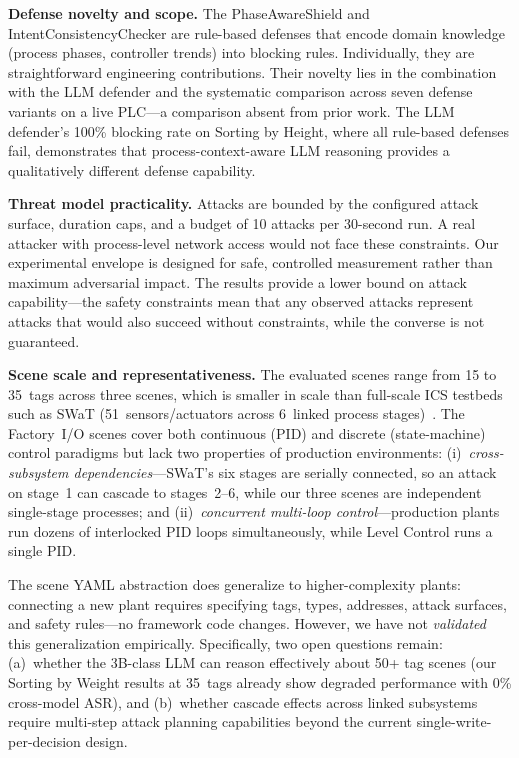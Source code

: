 \textbf{Defense novelty and scope.} The PhaseAwareShield and IntentConsistencyChecker are rule-based defenses that encode domain knowledge (process phases, controller trends) into blocking rules. Individually, they are straightforward engineering contributions. Their novelty lies in the combination with the LLM defender and the systematic comparison across seven defense variants on a live PLC---a comparison absent from prior work. The LLM defender's 100\% blocking rate on Sorting by Height, where all rule-based defenses fail, demonstrates that process-context-aware LLM reasoning provides a qualitatively different defense capability.

\textbf{Threat model practicality.} Attacks are bounded by the configured attack surface, duration caps, and a budget of 10 attacks per 30-second run. A real attacker with process-level network access would not face these constraints. Our experimental envelope is designed for safe, controlled measurement rather than maximum adversarial impact. The results provide a lower bound on attack capability---the safety constraints mean that any observed attacks represent attacks that would also succeed without constraints, while the converse is not guaranteed.

\textbf{Scene scale and representativeness.} The evaluated scenes range from 15 to 35~tags across three scenes, which is smaller in scale than full-scale ICS testbeds such as SWaT (51~sensors/actuators across 6~linked process stages)~\cite{mathur2016swat}. The Factory~I/O scenes cover both continuous (PID) and discrete (state-machine) control paradigms but lack two properties of production environments: (i)~\emph{cross-subsystem dependencies}---SWaT's six stages are serially connected, so an attack on stage~1 can cascade to stages~2--6, while our three scenes are independent single-stage processes; and (ii)~\emph{concurrent multi-loop control}---production plants run dozens of interlocked PID loops simultaneously, while Level Control runs a single PID.

The scene YAML abstraction does generalize to higher-complexity plants: connecting a new plant requires specifying tags, types, addresses, attack surfaces, and safety rules---no framework code changes. However, we have not \emph{validated} this generalization empirically. Specifically, two open questions remain: (a)~whether the 3B-class LLM can reason effectively about 50+ tag scenes (our Sorting by Weight results at 35~tags already show degraded performance with 0\% cross-model ASR), and (b)~whether cascade effects across linked subsystems require multi-step attack planning capabilities beyond the current single-write-per-decision design.


